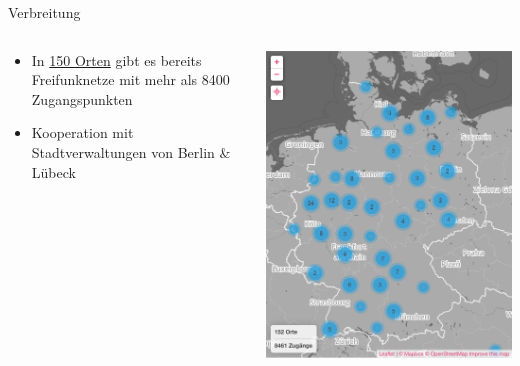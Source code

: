 \documentclass[t]{beamer}
\begin{document}
\begin{frame}{Verbreitung}
	\begin{columns}
		\begin{column}{0.6\textwidth}
			\begin{itemize}
				\item In  \href{http://freifunk.net/wie-mache-ich-mit/community-finden/}{150 Orten} gibt es bereits Freifunknetze mit mehr als 8400 Zugangspunkten
				\item Kooperation mit Stadtverwaltungen von Berlin \& Lübeck
			\end{itemize}
		\end{column}
		\begin{column}{0.4\textwidth}
			\begin{center}
				\includegraphics[width=\textwidth]{Bilder/Deutschlandkarte}
			\end{center}
		\end{column}
	\end{columns}
\end{frame}
\end{document}
